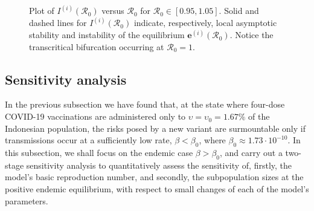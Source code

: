 \documentclass[11pt,reqno]{amsart}
\newcommand{\corr}[1]{\textcolor{blue}{#1}}
\newcommand{\cR}{\mathcal{R}}
\begin{document}
\begin{figure}
\caption{\label{fig:transcritical}Plot of $I^{(i)}\left(\cR_0\right)$ versus $\cR_0$ for $\cR_0\in[0.95,1.05]$. Solid and dashed lines for $I^{(i)}\left(\cR_0\right)$ indicate, respectively, local asymptotic stability and instability of the equilibrium $\mathbf{e}^{(i)}\left(\cR_0\right)$. Notice the transcritical bifurcation occurring at $\cR_0=1$.}
\end{figure}



\subsection{Sensitivity analysis}

In the previous subsection we have found that, at the state where four-dose COVID-19 vaccinations are administered only to $\upsilon=\upsilon_0=1.67\%$ of the Indonesian population, the risks posed by a new variant are surmountable only if transmissions occur at a sufficiently low rate, $\beta<\beta_0$, where $\beta_0\approx 1.73\cdot 10^{-10}$. In this subsection, we shall focus on the endemic case $\beta>\beta_0$, and carry out a two-stage sensitivity analysis \cite{ChitnisHymanCushing} to quantitatively assess the sensitivity of, firstly, the model's basic reproduction number, and secondly, the subpopulation sizes at the positive endemic equilibrium, with respect to small changes of each of the model's parameters.
\end{document}
